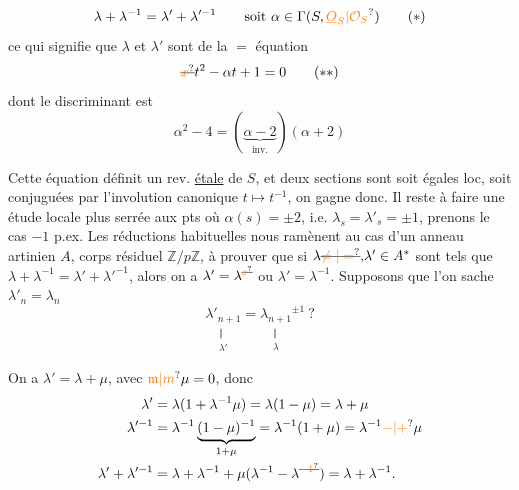 \[
\lambda+\lambda^{-1}=\lambda'+\lambda'^{-1}\qquad\text{soit }\alpha\in\Gamma(S,\unsure{\underline O_S|\mathcal O_S})\tag*{$(*)$}
\]
ce qui signifie que $\lambda$ et $\lambda'$ sont   de la $=$ équation
\[
\deleted{\unsure{x}}t^2-\alpha t+1=0\tag*{$(**)$}
\]
dont le discriminant est
\[
\alpha^2-4=(\underbrace{\alpha-2}_{\text{inv.}})(\alpha+2)
\]

   Cette équation définit un rev. \uline{étale} de $S$, et  deux sections sont soit égales loc, soit conjuguées par l'involution canonique $t\longmapsto t^{-1}$, on gagne donc. Il reste à faire une étude locale  plus serrée aux pts où $\alpha(s)=\pm2$, i.e. $\lambda_s=\lambda'_s=\pm1$, prenons le cas $-1$ p.ex.
Les réductions habituelles nous ramènent au cas d'un anneau   artinien $A$, corps résiduel  $\mathbb Z/p\mathbb Z$, à prouver que si $\lambda\deleted{\unsure{\ne|=}}{,}\lambda'\in A^*$ sont tels que $\lambda+\lambda^{-1}=\lambda'+\lambda'^{-1}$, alors on a $\lambda'=\lambda^{\deleted{\unsure{\varepsilon}}}$ ou $\lambda'=\lambda^{-1}$. Supposons que l'on sache $\lambda'_n=\lambda_n$ 
\[
\underset{\substack{\Vert\\\lambda'}}{\lambda'_{n+1}}=\underset{\substack{\Vert\\\lambda}}{\lambda_{n+1}}^{\pm1}\ ?
\]

On a  $\lambda'=\lambda+\mu$, avec $\unsure{\mathfrak m|m}\mu=0$,  donc
\[
\begin{aligned}
\lambda'&=\lambda(1+\lambda^{-1}\mu)=\lambda(1-\mu)=\lambda+\mu\\
\lambda'^{-1}&=\lambda^{-1}\underbrace{(1-\mu)^{-1}}_{1+\mu}=\lambda^{-1}(1+\mu)=\lambda^{-1}\unsure{-|+}\mu\\
\lambda'+\lambda'^{-1}&=\lambda+\lambda^{-1}+\mu(\lambda^{-1}-\lambda^{\deleted{\unsure{-1}}})=\lambda+\lambda^{-1}.
\end{aligned}
\]

